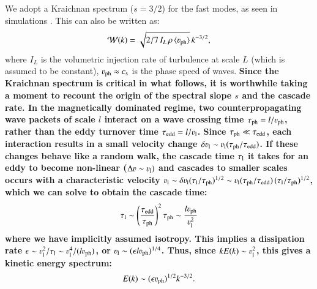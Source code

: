 \documentclass[fleqn,usenatbib,useAMS]{mnras}
\newcommand\C[1]{{\bf #1}}
\newcommand{\Vph}{\varv_\mathrm{ph}}
\begin{document}
We adopt a Kraichnan spectrum ($s=3/2$) for the fast modes, as seen in simulations \citep{cho03}. This can also be written as: 
\begin{equation}
  \label{eq:Wk}
  \mathcal{W}(k) =
\sqrt{2/7\,I_L\,\rho\,\langle \Vph \rangle}\,k^{-3/2},
\end{equation}
where $I_L$ is the volumetric injection rate of turbulence at scale $L$ (which
is assumed to be constant), $\varv_{\rm ph}\approx c_{\rm s}$ is the phase speed
of waves. \C{Since the Kraichnan spectrum is critical in what follows, it is
  worthwhile taking a moment to recount the origin of the spectral slope $s$ and
  the cascade rate. In the magnetically dominated regime, two counterpropagating
  wave packets of scale $l$ interact on a wave crossing time $\tau_{\rm
    ph}=l/\varv_{\rm ph}$, rather than the eddy turnover time $\tau_{\rm edd} =
  l/\varv_{\rm l}$.  Since $\tau_{\rm ph} \ll \tau_{\rm edd}$, each interaction
  results in a small velocity change $\delta \varv_{\rm l} \sim \varv_{\rm l}
  (\tau_{\rm ph}/\tau_{\rm edd})$. If these changes behave like a random walk,
  the cascade time $\tau_{\rm l}$ it takes for an eddy to become non-linear
  ($\Delta \varv \sim \varv_{\rm l})$ and cascades to smaller scales occurs with
  a characteristic velocity $\varv_{\rm l} \sim \delta \varv_{\rm l} (\tau_{\rm
    l}/\tau_{\rm ph})^{1/2} \sim \varv_{\rm l} (\tau_{\rm ph}/\tau_{\rm edd})\,
  (\tau_{\rm l}/\tau_{\rm ph})^{1/2}$, which we can solve to obtain the cascade
  time:
\begin{equation}
  \label{eqn:tau_l}
\tau_{\rm l} \sim \left(\frac{\tau_{\rm edd}}{\tau_{\rm ph}}\right)^{2} \tau_{\rm ph} \sim \frac{l \varv_{\rm ph}}{\varv_{\rm l}^{2}} 
\end{equation}
where we have implicitly assumed isotropy. This implies a dissipation rate $\epsilon \sim \varv_{\rm l}^{2}/\tau_{\rm l} \sim \varv_{\rm l}^{4}/(l \varv_{\rm ph})$, or $\varv_{\rm l} \sim (\epsilon l \varv_{\rm ph})^{1/4}$. Thus, since $k E(k)\sim \varv_{\rm l}^{2}$, this gives a kinetic energy spectrum: 
\begin{equation}
E(k) \sim (\epsilon \varv_{\rm ph})^{1/2} k^{-3/2}.
\end{equation}}
 
\end{document}
